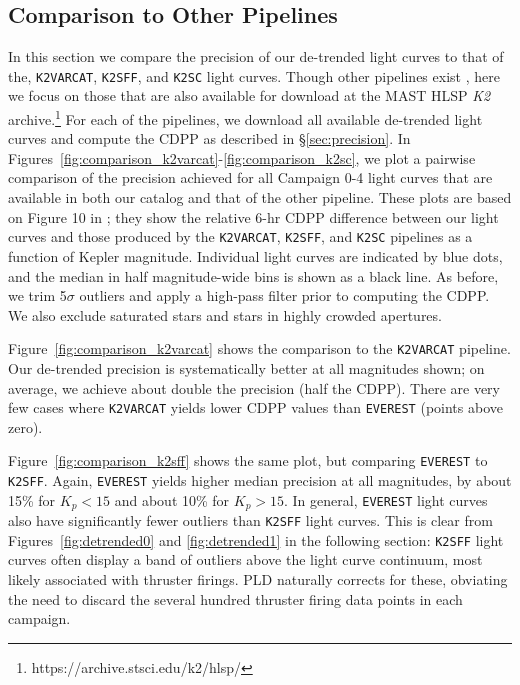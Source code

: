 \documentclass[]{emulateapj}
\begin{document}
\subsection{Comparison to Other Pipelines}
\label{sec:comparison}
In this section we compare the precision of our de-trended light curves to that of the,
\texttt{K2VARCAT}, \texttt{K2SFF}, and \texttt{K2SC} light curves. Though other
pipelines exist \citep[e.g.,][]{LUN15, HUA15, CRO15}, here we focus on those that 
are also available for download at
the MAST HLSP \emph{K2} archive.\footnote{https://archive.stsci.edu/k2/hlsp/}
For each of the pipelines, we download all available de-trended light curves and
compute the CDPP as described in \S\ref{sec:precision}. In 
Figures~\ref{fig:comparison_k2varcat}-\ref{fig:comparison_k2sc}, we plot a pairwise
comparison of the precision achieved for all Campaign 0-4 light curves that are
available in both our catalog and that of the other pipeline. These plots are based
on Figure 10 in \cite{AIG16}; they show the relative 6-hr CDPP difference between
our light curves and those produced by the \texttt{K2VARCAT}, \texttt{K2SFF}, and \texttt{K2SC}
pipelines as a function of Kepler magnitude. Individual light curves are indicated by
blue dots, and the median in half magnitude-wide bins is shown as a black line.
As before, we trim
5$\sigma$ outliers and apply a high-pass filter prior to computing the CDPP.
We also exclude saturated stars and stars in highly crowded apertures.

Figure~\ref{fig:comparison_k2varcat} shows the comparison to the \texttt{K2VARCAT}
pipeline. Our de-trended precision is systematically better at all magnitudes shown;
on average, we achieve about double the precision (half the CDPP). There are very
few cases where \texttt{K2VARCAT} yields lower CDPP values than \texttt{EVEREST}
(points above zero).

Figure~\ref{fig:comparison_k2sff} shows the same plot, but comparing \texttt{EVEREST} to
\texttt{K2SFF}. Again, \texttt{EVEREST} yields higher median precision at all
magnitudes, by about 15\% for $K_p < 15$ and about 10\% for $K_p > 15$. In general, \texttt{EVEREST}
light curves also have significantly fewer outliers than \texttt{K2SFF} light curves.
This is clear from Figures~\ref{fig:detrended0} and \ref{fig:detrended1} in the
following section: \texttt{K2SFF} light curves often display a band of outliers
above the light curve continuum, most likely associated with thruster firings. PLD
naturally corrects for these, obviating the need to discard the several hundred thruster
firing data points in each campaign.
\end{document}
